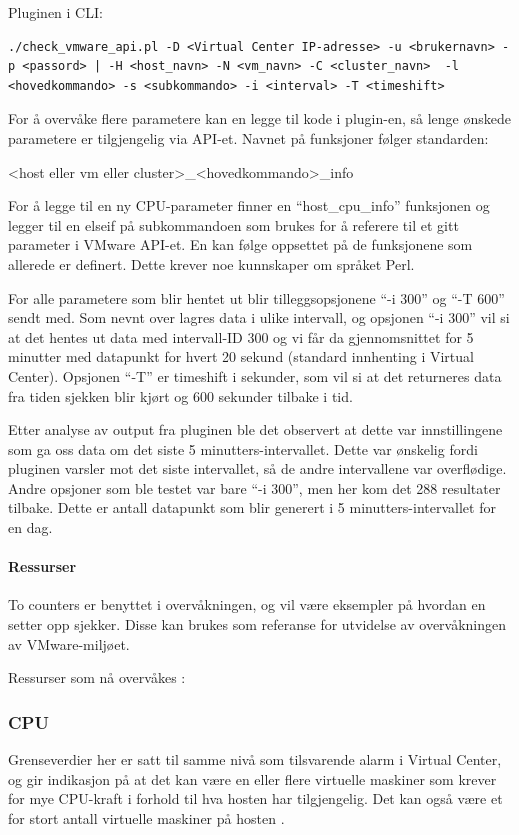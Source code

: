 Pluginen i CLI:
\begin{lstlisting}[style=example]
./check_vmware_api.pl -D <Virtual Center IP-adresse> -u <brukernavn> -p <passord> | -H <host_navn> -N <vm_navn> -C <cluster_navn>  -l <hovedkommando> -s <subkommando> -i <interval> -T <timeshift>
\end{lstlisting}

For å overvåke flere parametere kan en legge til kode i plugin-en, så lenge ønskede parametere er tilgjengelig via API-et. Navnet på funksjoner følger standarden:

<host eller vm eller cluster>\_<hovedkommando>\_info

For å legge til en ny CPU-parameter finner en ``host\_cpu\_info''  funksjonen og legger til en elseif på subkommandoen som brukes for å referere til et gitt parameter i VMware API-et. En kan følge oppsettet på de funksjonene som allerede er definert. Dette krever noe kunnskaper om språket Perl.

For alle parametere som blir hentet ut blir tilleggsopsjonene ``-i 300'' og ``-T 600'' sendt med. Som nevnt over lagres data i ulike intervall, og opsjonen ``-i 300''  vil si at det hentes ut data med intervall-ID 300 og vi får da gjennomsnittet for 5 minutter med datapunkt for hvert 20 sekund (standard innhenting i Virtual Center). Opsjonen ``-T''  er timeshift i sekunder, som vil si at det returneres data fra tiden sjekken blir kjørt og 600 sekunder tilbake i tid.

Etter analyse av output fra pluginen ble det observert at dette var innstillingene som ga oss data om det siste 5 minutters-intervallet. Dette var ønskelig fordi pluginen varsler mot det siste intervallet, så de andre intervallene var overflødige. Andre opsjoner som ble testet var bare ``-i 300'', men her kom det 288 resultater tilbake. Dette er antall datapunkt som blir generert i 5 minutters-intervallet for en dag. \cite{vmwareperfintervals}

\paragraph{Ressurser}
To counters er benyttet i overvåkningen, og vil være eksempler på hvordan en setter opp sjekker. Disse kan brukes som referanse for utvidelse av overvåkningen av VMware-miljøet.

Ressurser som nå overvåkes \cite{ciscovirtual} \cite{vmwaremonitoring}:

\subsubsection*{CPU}
Grenseverdier her er satt til samme nivå som tilsvarende alarm i Virtual Center, og gir indikasjon på at det kan være en eller flere virtuelle maskiner som krever for mye CPU-kraft i forhold til hva hosten har tilgjengelig. Det kan også være et for stort antall virtuelle maskiner på hosten \cite{vmwarecounters}.

